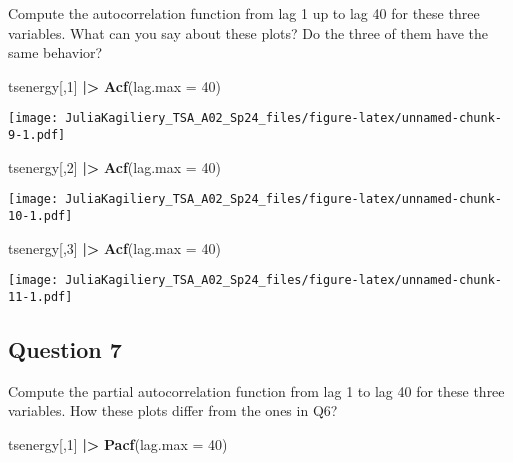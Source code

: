 \documentclass[
]{article}
\newenvironment{Shaded}{\begin{snugshade}}{\end{snugshade}}
\newcommand{\AttributeTok}[1]{\textcolor[rgb]{0.13,0.29,0.53}{#1}}
\newcommand{\DecValTok}[1]{\textcolor[rgb]{0.00,0.00,0.81}{#1}}
\newcommand{\FunctionTok}[1]{\textcolor[rgb]{0.13,0.29,0.53}{\textbf{#1}}}
\newcommand{\NormalTok}[1]{#1}
\newcommand{\SpecialCharTok}[1]{\textcolor[rgb]{0.81,0.36,0.00}{\textbf{#1}}}
\begin{document}
Compute the autocorrelation function from lag 1 up to lag 40 for these
three variables. What can you say about these plots? Do the three of
them have the same behavior?

\begin{Shaded}
\begin{Highlighting}[]
\NormalTok{tsenergy[,}\DecValTok{1}\NormalTok{] }\SpecialCharTok{|\textgreater{}}
  \FunctionTok{Acf}\NormalTok{(}\AttributeTok{lag.max =} \DecValTok{40}\NormalTok{)}
\end{Highlighting}
\end{Shaded}

\texttt{[image: JuliaKagiliery\_TSA\_A02\_Sp24\_files/figure-latex/unnamed-chunk-9-1.pdf]}

\begin{Shaded}
\begin{Highlighting}[]
\NormalTok{tsenergy[,}\DecValTok{2}\NormalTok{] }\SpecialCharTok{|\textgreater{}}
  \FunctionTok{Acf}\NormalTok{(}\AttributeTok{lag.max =} \DecValTok{40}\NormalTok{)}
\end{Highlighting}
\end{Shaded}

\texttt{[image: JuliaKagiliery\_TSA\_A02\_Sp24\_files/figure-latex/unnamed-chunk-10-1.pdf]}

\begin{Shaded}
\begin{Highlighting}[]
\NormalTok{tsenergy[,}\DecValTok{3}\NormalTok{] }\SpecialCharTok{|\textgreater{}}
  \FunctionTok{Acf}\NormalTok{(}\AttributeTok{lag.max =} \DecValTok{40}\NormalTok{)}
\end{Highlighting}
\end{Shaded}

\texttt{[image: JuliaKagiliery\_TSA\_A02\_Sp24\_files/figure-latex/unnamed-chunk-11-1.pdf]}

\hypertarget{question-7}{%
\subsection{Question 7}\label{question-7}}

Compute the partial autocorrelation function from lag 1 to lag 40 for
these three variables. How these plots differ from the ones in Q6?

\begin{Shaded}
\begin{Highlighting}[]
\NormalTok{tsenergy[,}\DecValTok{1}\NormalTok{] }\SpecialCharTok{|\textgreater{}}
  \FunctionTok{Pacf}\NormalTok{(}\AttributeTok{lag.max =} \DecValTok{40}\NormalTok{)}
\end{Highlighting}
\end{Shaded}
\end{document}
